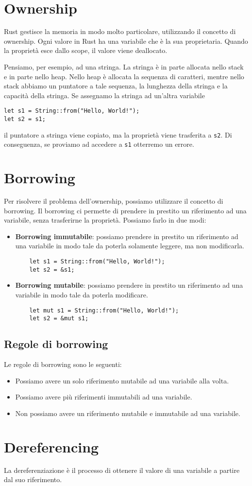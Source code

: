 \documentclass[12pt]{article}
\begin{document}
\section{Ownership}
Rust gestisce la memoria in modo molto particolare, utilizzando il concetto
di ownership. Ogni valore in Rust ha una variabile che è la sua proprietaria.
Quando la proprietà esce dallo scope, il valore viene deallocato.

Pensiamo, per esempio, ad una stringa. La stringa è in parte allocata nello stack
e in parte nello heap. Nello heap è allocata la sequenza di caratteri,
mentre nello stack abbiamo un puntatore a tale sequenza, la lunghezza della stringa
e la capacità della stringa. Se assegnamo la stringa ad un'altra variabile
\begin{verbatim}
let s1 = String::from("Hello, World!");
let s2 = s1;
\end{verbatim}
il puntatore a stringa viene copiato, ma la proprietà viene trasferita a \texttt{s2}.
Di conseguenza, se proviamo ad accedere a \texttt{s1} otterremo un errore.


\section{Borrowing}
Per risolvere il problema dell'ownership, possiamo utilizzare il concetto di borrowing.
Il borrowing ci permette di prendere in prestito un riferimento ad una variabile, 
senza trasferirne la proprietà. Possiamo farlo in due modi:
\begin{itemize}
    \item \textbf{Borrowing immutabile}: possiamo prendere in prestito un riferimento
    ad una variabile in modo tale da poterla solamente leggere, ma non modificarla.
    \begin{verbatim}
    let s1 = String::from("Hello, World!");
    let s2 = &s1;
    \end{verbatim}
    \item \textbf{Borrowing mutabile}: possiamo prendere in prestito un riferimento
    ad una variabile in modo tale da poterla modificare.
    \begin{verbatim}
    let mut s1 = String::from("Hello, World!");
    let s2 = &mut s1;
    \end{verbatim}
\end{itemize}

\subsection{Regole di borrowing}
Le regole di borrowing sono le seguenti:    
\begin{itemize}
    \item Possiamo avere un solo riferimento mutabile ad una variabile alla volta.
    \item Possiamo avere più riferimenti immutabili ad una variabile.
    \item Non possiamo avere un riferimento mutabile e immutabile ad una variabile.
\end{itemize}


\section{Dereferencing}
La dereferenziazione è il processo di ottenere il valore di una 
variabile a partire dal suo riferimento.
\end{document}
